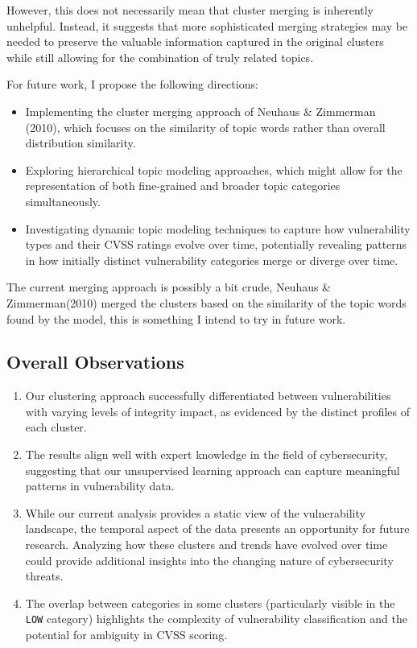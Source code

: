 \documentclass[12pt]{article}
\begin{document}
However, this does not necessarily mean that cluster merging is inherently unhelpful. Instead, it suggests that more sophisticated merging strategies may be needed to preserve the valuable information captured in the original clusters while still allowing for the combination of truly related topics.

For future work, I propose the following directions:

\begin{itemize}
	\item Implementing the cluster merging approach of Neuhaus \& Zimmerman (2010), which focuses on the similarity of topic words rather than overall distribution similarity.
	\item Exploring hierarchical topic modeling approaches, which might allow for the representation of both fine-grained and broader topic categories simultaneously.
	\item Investigating dynamic topic modeling techniques to capture how vulnerability types and their CVSS ratings evolve over time, potentially revealing patterns in how initially distinct vulnerability categories merge or diverge over time.
\end{itemize}

The current merging approach is possibly a bit crude, Neuhaus \&
Zimmerman(2010)\cite{cve_topic_modelling} merged the clusters based on the similarity of the topic
words found by the model, this is something I intend to try in future work.

\subsection{Overall Observations}

\begin{enumerate}

	\item Our clustering approach successfully differentiated between vulnerabilities with varying
	      levels of integrity impact, as evidenced by the distinct profiles of each cluster.

	\item The results align well with expert knowledge in the field of cybersecurity, suggesting
	      that our unsupervised learning approach can capture meaningful patterns in vulnerability
	      data.

	\item While our current analysis provides a static view of the vulnerability landscape, the
	      temporal aspect of the data presents an opportunity for future research. Analyzing how these
	      clusters and trends have evolved over time could provide additional insights into the
	      changing nature of cybersecurity threats.

	\item The overlap between categories in some clusters (particularly visible in the \texttt{LOW}
	      category) highlights the complexity of vulnerability classification and the potential for
	      ambiguity in CVSS scoring.

\end{enumerate}
\end{document}

